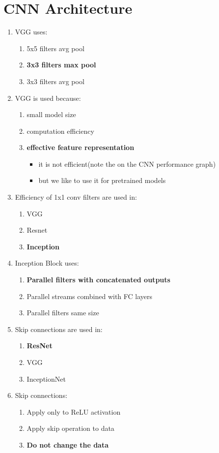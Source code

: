 \documentclass{report}
\numberwithin{equation}{section}
\begin{document}
\setcounter{section}{3}
\renewcommand{\thesection}{\arabic{section}}
\section{CNN Architecture}
\begin{enumerate}
\item VGG uses:
\begin{enumerate}[label=\alph*.]
    \item 5x5 filters avg pool
    \item \textbf{3x3 filters max pool}
    \item 3x3 filters avg pool
\end{enumerate}
\item VGG is used because:
\begin{enumerate}[label=\alph*.]
    \item small model size
    \item computation efficiency
    \item \textbf{effective feature representation}
    \begin{itemize}
        \item it is not efficient(note the on the CNN performance graph) 
        \item but we like to use it for pretrained models
    \end{itemize}
\end{enumerate}
\item Efficiency of 1x1 conv filters are used in:
\begin{enumerate}[label=\alph*.]
    \item VGG
    \item Resnet
    \item \textbf{Inception}
\end{enumerate}
\item Inception Block uses:
\begin{enumerate}[label=\alph*.]
    \item \textbf{Parallel filters with concatenated outputs}
    \item Parallel streams combined with FC layers
    \item Parallel filters same size
\end{enumerate}
\item Skip connections are used in:
\begin{enumerate}[label=\alph*.]
    \item \textbf{ResNet}
    \item VGG
    \item InceptionNet
\end{enumerate}
\item Skip connections:
\begin{enumerate}[label=\alph*.]
    \item Apply only to ReLU activation
    \item Apply skip operation to data
    \item \textbf{Do not change the data}
\end{enumerate}
\end{enumerate}
\end{document}
